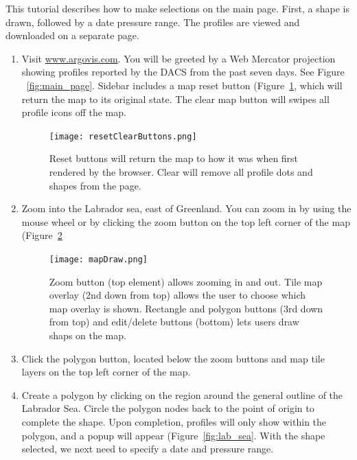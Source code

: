 This tutorial describes how to make selections on the main page. First, a shape is drawn, followed by a date pressure range. The profiles are viewed and downloaded on a separate page.

\begin{enumerate}
\item Visit \url{www.argovis.com}. You will be greeted by a Web Mercator projection showing profiles reported by the DACS from the past seven days. See Figure ~\ref{fig:main_page}. Sidebar includes a map reset button (Figure~\ref{fig:reset_clear_buttons}, which will return the map to its original state. The clear map button will swipes all profile icons off the map.

\begin{figure}[H]
\begin{minipage}{6in}
\centering
\texttt{[image: resetClearButtons.png]}
\caption{\label{fig:reset_clear_buttons} Reset buttons will return the map to how it was when first rendered by the browser. Clear will remove all profile dots and shapes from the page.}
\end{minipage}
\end{figure}

\item Zoom into the Labrador sea, east of Greenland. You can zoom in by using the mouse wheel or by clicking the zoom button on the top left corner of the map (Figure~\ref{fig:map_draw}

\begin{figure}[H]
\begin{minipage}{6in}
\centering
\texttt{[image: mapDraw.png]}
\caption{\label{fig:map_draw} Zoom button (top element) allows zooming in and out. Tile map overlay (2nd down from top) allows the user to choose which map overlay is shown. Rectangle and polygon buttons (3rd down from top) and edit/delete buttons (bottom) lets users draw shaps on the map.}
\end{minipage}
\end{figure}

\item Click the polygon button, located below the zoom buttons and map tile layers on the top left corner of the map.

\item Create a polygon by clicking on the region around the general outline of the Labrador Sea. Circle the polygon nodes back to the point of origin to complete the shape. Upon completion, profiles will only show within the polygon, and a popup will appear (Figure~\ref{fig:lab_sea}. With the shape selected, we next need to specify a date and pressure range.


\end{enumerate}
